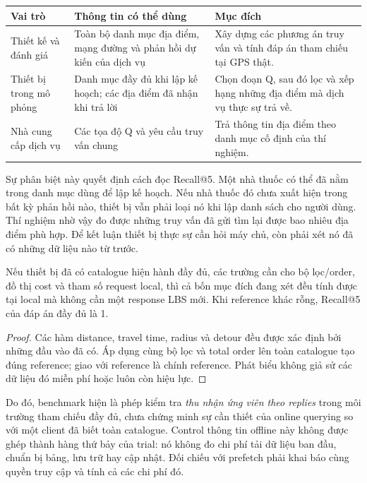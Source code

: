 \begin{center}\small
\begin{tabularx}{\linewidth}{@{}P{3.3cm}YY@{}}\toprule
Vai trò & Thông tin có thể dùng & Mục đích\\\midrule
Thiết kế và đánh giá & Toàn bộ danh mục địa điểm, mạng đường và phản hồi dự kiến của dịch vụ &
Xây dựng các phương án truy vấn và tính đáp án tham chiếu tại GPS thật.\\
Thiết bị trong mô phỏng & Danh mục đầy đủ khi lập kế hoạch; các địa điểm đã nhận khi trả lời &
Chọn đoạn Q, sau đó lọc và xếp hạng những địa điểm mà dịch vụ thực sự trả về.\\
Nhà cung cấp dịch vụ & Các tọa độ Q và yêu cầu truy vấn chung &
Trả thông tin địa điểm theo danh mục cố định của thí nghiệm.\\\bottomrule
\end{tabularx}
\end{center}

Sự phân biệt này quyết định cách đọc Recall@5. Một nhà thuốc có thể đã nằm trong danh mục dùng để lập kế hoạch. Nếu nhà thuốc đó chưa xuất hiện trong bất kỳ phản hồi nào, thiết bị vẫn phải loại nó khi lập danh sách cho người dùng. Thí nghiệm nhờ vậy đo được những truy vấn đã gửi tìm lại được bao nhiêu địa điểm phù hợp. Để kết luận thiết bị thực sự cần hỏi máy chủ, còn phải xét nó đã có những dữ liệu nào từ trước.

\begin{proposition}\label{prop:offline-information}
Nếu thiết bị đã có catalogue hiện hành đầy đủ, các trường cần cho bộ lọc/order, đồ thị cost và
tham số request local, thì cả bốn mục đích đang xét đều tính được tại local mà không cần một
response LBS mới. Khi reference khác rỗng, Recall@5 của đáp án đầy đủ là 1.
\end{proposition}
\begin{proof}
Các hàm distance, travel time, radius và detour đều được xác định bởi những đầu vào đã có.
Áp dụng cùng bộ lọc và total order lên toàn catalogue tạo đúng reference; giao với reference
là chính reference. Phát biểu không giả sử các dữ liệu đó miễn phí hoặc luôn còn hiệu lực.
\end{proof}

Do đó, benchmark hiện là phép kiểm tra \emph{thu nhận ứng viên theo replies} trong môi trường tham
chiếu đầy đủ, chưa chứng minh sự cần thiết của online querying so với một client đã biết toàn
catalogue. Control thông tin offline này không được ghép thành hàng thứ bảy của trial: nó không
đo chi phí tải dữ liệu ban đầu, chuẩn bị bảng, lưu trữ hay cập nhật. Đối chiếu với prefetch phải
khai báo cùng quyền truy cập và tính cả các chi phí đó.

